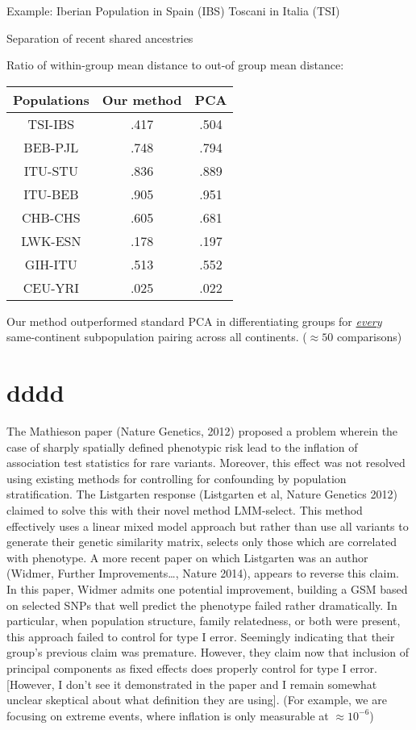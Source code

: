 \documentclass[english]{article}
\providecommand{\tabularnewline}{\\}
\begin{document}
{\tiny Example:
Iberian Population in Spain (IBS)
Toscani in Italia (TSI)}

Separation of recent shared ancestries

Ratio of within-group mean distance to out-of group mean distance:

\begin{tabular}{|c||c|c|}
\hline 
\multicolumn{1}{|c|}{Populations} & Our method & PCA\tabularnewline
\hline 
\hline 
TSI-IBS & .417 & .504\tabularnewline
\hline 
BEB-PJL & .748 & .794\tabularnewline
\hline 
ITU-STU & .836 & .889\tabularnewline
\hline 
ITU-BEB & .905 & .951\tabularnewline
\hline 
CHB-CHS & .605 & .681\tabularnewline
\hline 
LWK-ESN & .178 & .197\tabularnewline
\hline 
GIH-ITU & .513 & .552\tabularnewline
\hline 
CEU-YRI & .025 & .022\tabularnewline
\hline 
\end{tabular}

Our method outperformed standard PCA in differentiating groups for
\emph{\uline{every}} same-continent subpopulation pairing across
all continents. ($\approx50$ comparisons)


\section*{dddd}

The Mathieson paper (Nature Genetics, 2012) proposed a problem wherein
the case of sharply spatially defined phenotypic risk lead to the
inflation of association test statistics for rare variants. Moreover,
this effect was not resolved using existing methods for controlling
for confounding by population stratification. The Listgarten response
(Listgarten et al, Nature Genetics 2012) claimed to solve this with
their novel method LMM-select. This method effectively uses a linear
mixed model approach but rather than use all variants to generate
their genetic similarity matrix, selects only those which are correlated
with phenotype. A more recent paper on which Listgarten was an author
(Widmer, Further Improvements…, Nature 2014), appears to reverse this
claim. In this paper, Widmer admits one potential improvement, building
a GSM based on selected SNPs that well predict the phenotype failed
rather dramatically. In particular, when population structure, family
relatedness, or both were present, this approach failed to control
for type I error. Seemingly indicating that their group’s previous
claim was premature. However, they claim now that inclusion of principal
components as fixed effects does properly control for type I error.
{[}However, I don’t see it demonstrated in the paper and I remain
somewhat unclear skeptical about what definition they are using{]}.
(For example, we are focusing on extreme events, where inflation is
only measurable at $\approx10^{-6}$)
\end{document}
